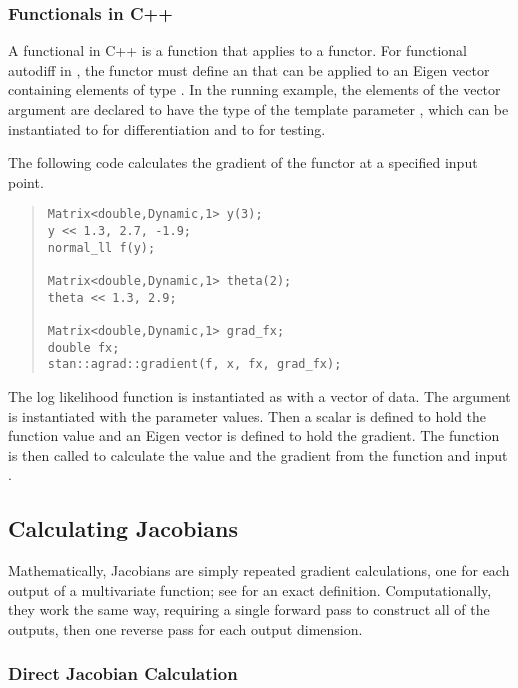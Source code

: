 \documentclass[10pt]{article}
\begin{document}
\subsubsection{Functionals in C++}

A functional in C++ is a function that applies to a functor.  For
functional autodiff in , the functor must define an
 that can be applied to an Eigen vector containing
elements of type .  In the running example, the
elements of the vector argument are declared to have the type of the
template parameter , which can be instantiated to
 for differentiation and to  for
testing.

The following code calculates the gradient of the functor at a
specified input point.
%
\begin{quote}
\begin{Verbatim}
Matrix<double,Dynamic,1> y(3);
y << 1.3, 2.7, -1.9;
normal_ll f(y);

Matrix<double,Dynamic,1> theta(2);
theta << 1.3, 2.9;

Matrix<double,Dynamic,1> grad_fx;
double fx;
stan::agrad::gradient(f, x, fx, grad_fx);
\end{Verbatim}
\end{quote}
%
The log likelihood function is instantiated as  with a vector
of data.  The argument  is instantiated with the parameter
values.  Then a scalar  is defined to hold the function value
and an Eigen vector  is defined to hold the gradient.
The function  is then called to calculate the value and
the gradient from the function  and input .


\subsection{Calculating Jacobians}

Mathematically, Jacobians are simply repeated gradient calculations,
one for each output of a multivariate function; see
 for an exact definition.
Computationally, they work the same way, requiring a single forward
pass to construct all of the outputs, then one reverse pass for each
output dimension.

\subsubsection{Direct Jacobian Calculation}
\end{document}
